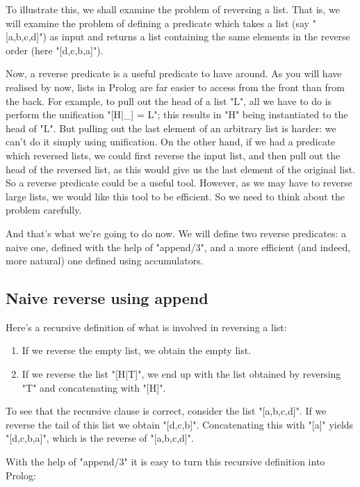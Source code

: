 To illustrate this, we shall examine the problem of reversing a list.
That is, we will examine the problem of defining a predicate which
takes a list (say "[a,b,c,d]") as input and returns a list
containing the same elements in the reverse order (here
"[d,c,b,a]").

Now, a reverse predicate is a useful predicate to have around. As you
will have realised by now, lists in Prolog are far easier to access
from the front than from the back. For example, to pull out the head
of a list "L", all we have to do is perform the unification
"[H|\_] = L"; this results in "H" being instantiated to the head of "L". But
pulling out the last element of an arbitrary list is harder: we can't
do it simply using unification.  On the other hand, if we had a
predicate which reversed lists, we could first reverse the input list,
and then pull out the head of the reversed list, as this would give us
the last element of the original list.  So a reverse predicate could
be a useful tool.  However, as we may have to reverse large lists, we
would like this tool to be efficient.  So we need to think about the
problem carefully.

And that's what we're going to do now.  We will define two reverse
predicates: a naive one, defined with the help of "append/3", and a
more efficient (and indeed, more natural) one defined using
accumulators.

\subsection*{Naive reverse using append}\label{SUBSEC.L6.REVERSE.NAIVE}



Here's a recursive definition of what is involved in reversing a list:

\begin{enumerate}
\item{}If we reverse the empty list, we obtain the
        empty list.
\item{}If we reverse the list "[H|T]", we end up with the list
        obtained by reversing "T" and concatenating with "[H]".
\end{enumerate}
To see that the recursive clause is correct, consider the list
"[a,b,c,d]".  If we reverse the tail of this list we obtain
"[d,c,b]".  Concatenating this with "[a]" yields
"[d,c,b,a]", which is the reverse of "[a,b,c,d]".

With the help of "append/3" it is easy to turn this recursive
definition into Prolog:

